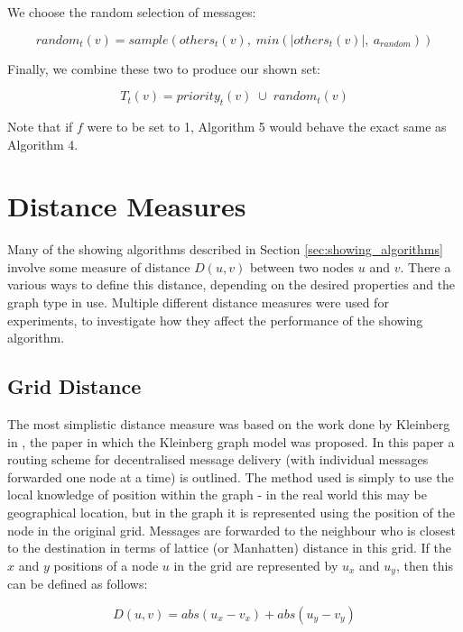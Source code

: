 \documentclass[bsc,frontabs,twoside,singlespacing,parskip,deptreport]{infthesis}     %
\begin{document}
We choose the random selection of messages:

\begin{equation}
random_{t}(v) = sample(others_{t}(v), \; min(|others_{t}(v)|, \: a_{random}))
\end{equation}

Finally, we combine these two to produce our shown set:

\begin{equation}
T_{t}(v) = priority_{t}(v) \; \cup \; random_{t}(v)
\end{equation}

Note that if $f$ were to be set to 1, Algorithm 5 would behave the exact same as Algorithm 4.


\section{Distance Measures} \label{sec:distance_measures}
Many of the showing algorithms described in Section \ref{sec:showing_algorithms} involve some measure of distance $D(u, v)$ between two nodes $u$ and $v$. There a various ways to define this distance, depending on the desired properties and the graph type in use. Multiple different distance measures were used for experiments, to investigate how they affect the performance of the showing algorithm.

\subsection{Grid Distance}
The most simplistic distance measure was based on the work done by Kleinberg in \cite{Kleinberg00}, the paper in which the Kleinberg graph model was proposed. In this paper a routing scheme for decentralised message delivery (with individual messages forwarded one node at a time) is outlined. The method used is simply to use the local knowledge of position within the graph - in the real world this may be geographical location, but in the graph it is represented using the position of the node in the original grid. Messages are forwarded to the neighbour who is closest to the destination in terms of lattice (or Manhatten) distance in this grid. If the $x$ and $y$ positions of a node $u$ in the grid are represented by $u_{x}$ and $u_{y}$, then this can be defined as follows:

\begin{equation}
D(u, v) = abs(u_{x} - v_{x}) + abs(u_{y} - v_{y})
\end{equation}
\end{document}

